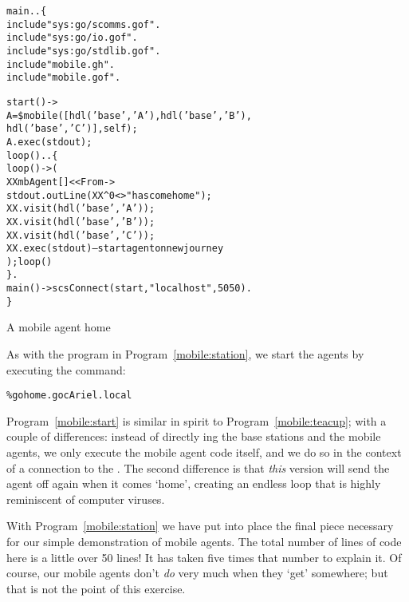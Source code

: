 \begin{program}
\begin{alltt}
main..\{
  include "sys:go/scomms.gof".
  include "sys:go/io.gof".
  include "sys:go/stdlib.gof".
  include "mobile.gh".
  include "mobile.gof".

  start() ->
      A = \$mobile([hdl('base','A'),hdl('base','B'),
                    hdl('base','C')],self);
      A.exec(stdout);
      loop() .. \{
        loop() -> (
             XX\impl{}mbAgent[] << From ->
                 stdout.outLine(XX^0<>" has come home");
                 XX.visit(hdl('base','A'));
                 XX.visit(hdl('base','B'));
                 XX.visit(hdl('base','C'));
                 XX.exec(stdout)  -- start agent on new journey
            ); loop()
      \}.
  main() -> scsConnect(start,"localhost",5050).
\}
\end{alltt}
\caption{A mobile agent home\label{mobile:start}}
\end{program}
As with the  program in Program~\vref{mobile:station}, we start the agents by executing the command:
\begin{alltt}
\% go home.goc Ariel.local
\end{alltt}

Program~\vref{mobile:start} is similar in spirit to Program~\vref{mobile:teacup}; with a couple of differences: instead of directly ing the base stations and the mobile agents, we only execute the mobile agent code itself, and we do so in the context of a connection to the . The second difference is that \emph{this} version will send the agent off again when it comes `home', creating an endless loop that is highly reminiscent of computer viruses.

With Program~\vref{mobile:station} we have put into place the final piece necessary for our simple demonstration of mobile agents. The total number of lines of \go code here is a little over 50 lines! It has taken five times that number to explain it. Of course, our mobile agents don't \emph{do} very much when they `get' somewhere; but that is not the point of this exercise.








